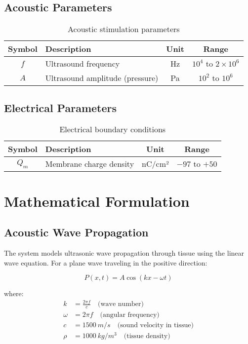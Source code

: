 \documentclass[11pt,a4paper]{article}
\begin{document}
\subsection{Acoustic Parameters}

\begin{table}[h!]
\centering
\begin{tabular}{clcc}
\toprule
\textbf{Symbol} & \textbf{Description} & \textbf{Unit} & \textbf{Range} \\
\midrule
$f$ & Ultrasound frequency & Hz & $10^4$ to $2 \times 10^6$ \\
$A$ & Ultrasound amplitude (pressure) & Pa & $10^2$ to $10^6$ \\
\bottomrule
\end{tabular}
\caption{Acoustic stimulation parameters}
\end{table}

\subsection{Electrical Parameters}

\begin{table}[h!]
\centering
\begin{tabular}{clcc}
\toprule
\textbf{Symbol} & \textbf{Description} & \textbf{Unit} & \textbf{Range} \\
\midrule
$Q_m$ & Membrane charge density & nC/cm² & $-97$ to $+50$ \\
\bottomrule
\end{tabular}
\caption{Electrical boundary conditions}
\end{table}

\section{Mathematical Formulation}

\subsection{Acoustic Wave Propagation}

The system models ultrasonic wave propagation through tissue using the linear wave equation. For a plane wave traveling in the positive direction:

\begin{equation}
P(x,t) = A \cos(kx - \omega t)
\end{equation}

where:
\begin{align}
k &= \frac{2\pi f}{c} \quad \text{(wave number)} \\
\omega &= 2\pi f \quad \text{(angular frequency)} \\
c &= \SI{1500}{m/s} \quad \text{(sound velocity in tissue)} \\
\rho &= \SI{1000}{kg/m^3} \quad \text{(tissue density)}
\end{align}
\end{document}
